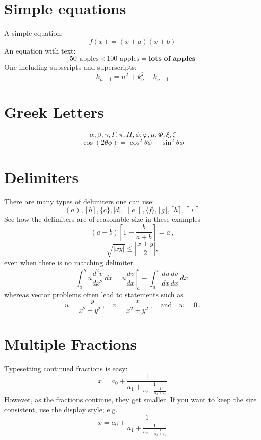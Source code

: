 \section{Simple equations}
A simple equation:
\[
    f(x)=(x+a)(x+b)
\]
An equation with text:
\begin{equation}
    50 \text{ apples} \times 100 \text{ apples} =
    \textbf{lots of apples}
\end{equation}
One including subscripts and superscripts:
\[ k_{n+1} = n^2 + k_n^2 - k_{n-1} \]

\section{Greek Letters}
\[ \alpha,  \beta,  \gamma, \Gamma, \pi, \Pi, \phi, \varphi, \mu, \Phi, \xi, \zeta \]
\[ \cos(2\theta\phi) = \cos^2 \theta\phi - \sin^2 \theta\phi \]

\section{Delimiters}
There are many types of delimiters one can use:
\[ ( a ), [ b ], \{ c \}, | d |, \| e \|,
    \langle f \rangle, \lfloor g \rfloor,
    \lceil h \rceil, \ulcorner i \urcorner \]
See how the delimiters are of reasonable size in these examples
\[
    \left(a+b\right)\left[1-\frac{b}{a+b}\right]=a\,,
\]
\[
    \sqrt{|xy|}\leq\left|\frac{x+y}{2}\right|,
\]
even when there is no matching delimiter
\[
    \int_a^bu\frac{d^2v}{dx^2}\,dx
    =\left.u\frac{dv}{dx}\right|_a^b
    -\int_a^b\frac{du}{dx}\frac{dv}{dx}\,dx.
\]
whereas vector problems often lead to statements such as
\[
    u=\frac{-y}{x^2+y^2}\,,\quad
    v=\frac{x}{x^2+y^2}\,,\quad\text{and}\quad
    w=0\,.
\]

\section{Multiple Fractions}
Typesetting continued fractions is easy:
\[
    x = a_0 + \frac{1}{a_1 + \frac{1}{a_2 + \frac{1}{a_3 + a_4}}}
\]
However, as the fractions continue, they get smaller. If you want to keep the size consistent, use the display style; e.g.
\[
    x = a_0 + \frac{1}{\displaystyle a_1
        + \frac{1}{\displaystyle a_2
            + \frac{1}{\displaystyle a_3 + a_4}}}
\]

